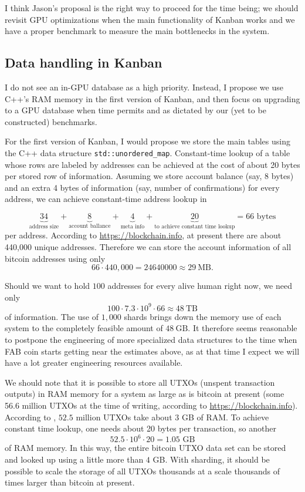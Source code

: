 \documentclass{article}
\begin{document}
I think Jason's proposal is the right way to proceed for the time being; we should revisit GPU optimizations when the main functionality of Kanban works and we have a proper benchmark to measure the main bottlenecks in the system. 

\subsection{Data handling in Kanban}
I do not see an in-GPU database as a high priority. Instead, I propose we use C++'s RAM memory in the first version of Kanban, and then focus on upgrading to a GPU database when time permits and as dictated by our (yet to be constructed) benchmarks. 

For the first version of Kanban, I would propose we store the main tables using the C++ data structure \verb|std::unordered_map|. Constant-time lookup of a table whose rows are labeled by addresses can be achieved at the cost of about 20 bytes per stored row of information. Assuming we store account balance (say, 8 bytes) and an extra 4 bytes of information (say, number of confirmations) for every address, we can achieve constant-time address lookup in 

\[
\underbrace{34}_{\text{address size}} + \underbrace{8}_{\text{account ballance}} + \underbrace{4}_{\text{meta info}} + \underbrace{20}_{\text{to achieve constant time lookup}} = 66 \text{ bytes}
\]
per address. According to \url{https://blockchain.info}, at present there are about 440,000 unique addresses. Therefore we can store the account information of all bitcoin addresses using only
\[
66\cdot 440,000 = 24640000 \approx 29~\text{MB}.
\]

Should we want to hold $100$ addresses for every alive human right now, we need only 
\[
100\cdot 7.3 \cdot 10^9 \cdot 66 \approx 48~\text{TB} 
\]
of information. The use of $1,000$ shards brings down the memory use of each system to the completely feasible amount of $48~\text{GB}$. It therefore seems reasonable to postpone the engineering of more specialized data structures to the time when FAB coin starts getting near the estimates above, as at that time I expect we will have a lot greater engineering resources available.


We should note that it is possible to store all UTXOs (unspent transaction outputs) in RAM memory for a system as large as is bitcoin at present (some 56.6 million UTXOs at the time of writing, according to \url{https://blockchain.info}). According to \cite{cryptoeprint:2017:analysisofbitcoinUTXOs}, $52.5$ million UTXOs take about $3$ GB of RAM. To achieve constant time lookup, one needs about 20 bytes per transaction, so another 
\[
52.5 \cdot 10^6 \cdot 20 = 1.05\text{~GB}
\]
of RAM memory. In this way, the entire bitcoin UTXO data set can be stored and looked up using a little more than $4$ GB. With sharding, it should be possible to scale the storage of all UTXOs thousands at a scale thousands of times larger than bitcoin at present.
\newpage




\end{document}
